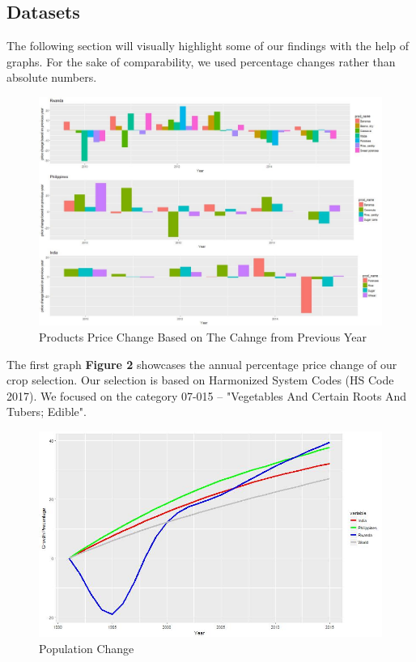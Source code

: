 \documentclass[11pt]{article}
\begin{document}
\subsection{Datasets}
The following section will visually highlight some of our findings with the help of graphs. For the sake of comparability, we used percentage changes rather than absolute numbers.

\FloatBarrier
\begin{figure}
\begin{center}
\includegraphics[scale=0.80]{barplot_price_change.jpg}
\caption{Products Price Change Based on The Cahnge from Previous Year }
\label{figure2}
\end{center}
\end{figure}
\FloatBarrier
The first graph \textbf{Figure 2} showcases the annual percentage price change of our crop selection.  Our selection is based on Harmonized System Codes (HS Code 2017). We focused on the category 07-015 – "Vegetables And Certain Roots And Tubers; Edible". 

\FloatBarrier
\begin{figure}[!htb]
\begin{center}
\includegraphics[scale=0.65]{population_plot.jpg}
\caption{Population Change}
\label{figure3}
\end{center}
\end{figure}
\FloatBarrier
\end{document}
